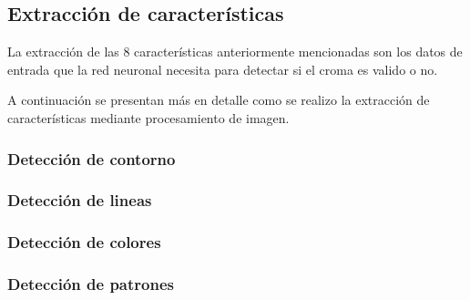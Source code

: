\subsection{Extracción de características}


La extracción de las 8 características anteriormente mencionadas son los datos de entrada que la red neuronal necesita para detectar si el croma es valido o no.

A continuación se presentan más en detalle como se realizo la extracción de características mediante procesamiento de imagen.

\subsubsection{Detección de contorno}

\subsubsection{Detección de lineas}
\subsubsection{Detección de colores}
\subsubsection{Detección de patrones}


